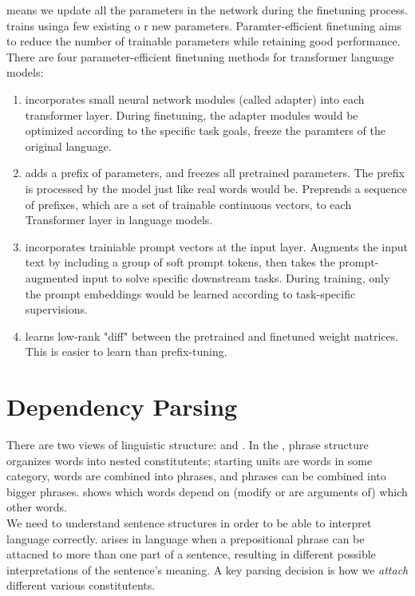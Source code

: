 \documentclass{article}
\begin{document}
 means we update all the parameters in the network during the finetuning process.  trains usinga few existing o r new parameters. Paramter-efficient finetuning aims to reduce the number of trainable parameters while retaining good performance. There are four parameter-efficient finetuning methods for transformer language models: 
\begin{enumerate}
  \item {} incorporates small neural network modules (called adapter) into each transformer layer. During finetuning, the adapter modules would be optimized according to the specific task goals, freeze the paramters of the original language. 
  \item {} adds a prefix of parameters, and freezes all pretrained parameters. The prefix is processed by the model just like real words would be. Preprends a sequence of prefixes, which are a set of trainable continuous vectors, to each Transformer layer in language models. 
  \item {} incorporates trainiable prompt vectors at the input layer. Augments the input text by including a group of soft prompt tokens, then takes the prompt-augmented input to solve specific downstream tasks. During training, only the prompt embeddings would be learned according to task-specific supervisions. 
  \item {} learns low-rank "diff" between the pretrained and finetuned weight matrices. This is easier to learn than prefix-tuning. 
\end{enumerate}

\section{Dependency Parsing}

There are two views of linguistic structure:  and . In the , phrase structure organizes words into nested constitutents; starting units are words in some category, words are combined into phrases, and phrases can be combined into bigger phrases.  shows which words depend on (modify or are arguments of) which other words. \\ 

We need to understand sentence structures in order to be able to interpret language correctly.  arises in language when a prepositional phrase can be attacned to more than one part of a sentence, resulting in different possible interpretations of the sentence's meaning. A key parsing decision is how we \emph{attach} different various constitutents. \\ 
\end{document}
